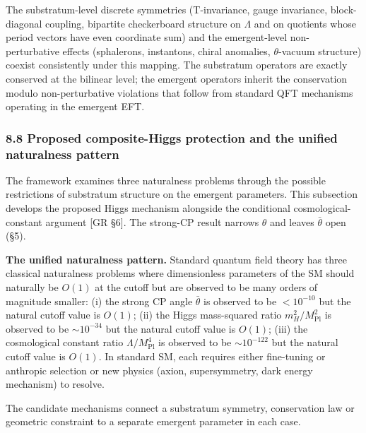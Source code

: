 \documentclass[
]{article}
\begin{document}
The substratum-level discrete symmetries (T-invariance, gauge
invariance, block-diagonal coupling, bipartite checkerboard structure on
\(\Lambda\) and on quotients whose period vectors have even coordinate
sum) and the emergent-level non-perturbative effects (sphalerons,
instantons, chiral anomalies, \(\theta\)-vacuum structure) coexist
consistently under this mapping. The substratum operators are exactly
conserved at the bilinear level; the emergent operators inherit the
conservation modulo non-perturbative violations that follow from
standard QFT mechanisms operating in the emergent EFT.

\hypertarget{proposed-composite-higgs-protection-and-the-unified-naturalness-pattern}{%
\subsubsection{8.8 Proposed composite-Higgs protection and the unified
naturalness
pattern}\label{proposed-composite-higgs-protection-and-the-unified-naturalness-pattern}}

The framework examines three naturalness problems through the possible
restrictions of substratum structure on the emergent parameters. This
subsection develops the proposed Higgs mechanism alongside the
conditional cosmological-constant argument {[}GR §6{]}. The strong-CP
result narrows \(\theta\) and leaves \(\bar\theta\) open (§5).

\textbf{The unified naturalness pattern.} Standard quantum field theory
has three classical naturalness problems where dimensionless parameters
of the SM should naturally be \(O(1)\) at the cutoff but are observed to
be many orders of magnitude smaller: (i) the strong CP angle
\(\bar\theta\) is observed to be \(< 10^{-10}\) but the natural cutoff
value is \(O(1)\); (ii) the Higgs mass-squared ratio
\(m_H^2/M_{\mathrm{Pl}}^2\) is observed to be \(\sim 10^{-34}\) but the
natural cutoff value is \(O(1)\); (iii) the cosmological constant ratio
\(\Lambda/M_{\mathrm{Pl}}^4\) is observed to be \(\sim 10^{-122}\) but
the natural cutoff value is \(O(1)\). In standard SM, each requires
either fine-tuning or anthropic selection or new physics (axion,
supersymmetry, dark energy mechanism) to resolve.

The candidate mechanisms connect a substratum symmetry, conservation law
or geometric constraint to a separate emergent parameter in each case.
\end{document}
